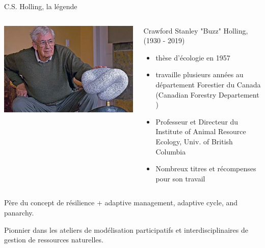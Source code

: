 \documentclass[11,aspectratio=1610]{beamer}
\begin{document}
\begin{frame}{C.S. Holling, la légende}



 \begin{columns}
             \centering
             \includegraphics[width=\textwidth]{img/Holling.jpg}
\begin{scriptsize}
Crawford Stanley "Buzz" Holling, (1930 - 2019)

\begin{itemize}
  \item thèse d'écologie en 1957
  \item travaille plusieurs années au département Forestier du Canada (Canadian Forestry Departement )
  \item Professeur et Directeur du Institute of Animal Resource Ecology, Univ. of British Columbia 
  \item Nombreux titres et récompenses pour son travail 
\end{itemize}
\end{scriptsize}
\end{columns}

\begin{small}
\vspace{1cm}
Père du concept de \alert{résilience} +   adaptive management, adaptive cycle, and panarchy. 

\vspace{0.5 cm}
Pionnier dans les ateliers de modélisation participatifs et \alert{interdisciplinaires} de \alert{gestion de ressources naturelles}. 




\end{small}

\end{frame}
\end{document}
